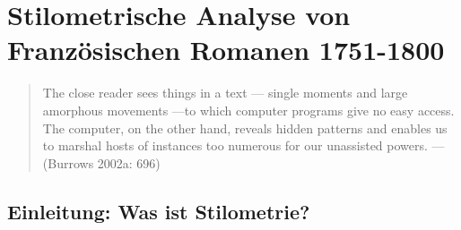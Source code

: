 \documentclass[
  letterpaper,
  DIV=11,
  numbers=noendperiod]{scrreprt}
\begin{document}

\chapter{\texorpdfstring{\textbf{Stilometrische Analyse von
Französischen Romanen
1751-1800}}{Stilometrische Analyse von Französischen Romanen 1751-1800}}\label{stilometrische-analyse-von-franzuxf6sischen-romanen-1751-1800}

\begin{quote}
The close reader sees things in a text --- single moments and large
amorphous movements ---to which computer programs give no easy access.
The computer, on the other hand, reveals hidden patterns and enables us
to marshal hosts of instances too numerous for our unassisted powers.
--- (Burrows 2002a: 696)
\end{quote}

\section{Einleitung: Was ist
Stilometrie?}\label{einleitung-was-ist-stilometrie}
\end{document}
